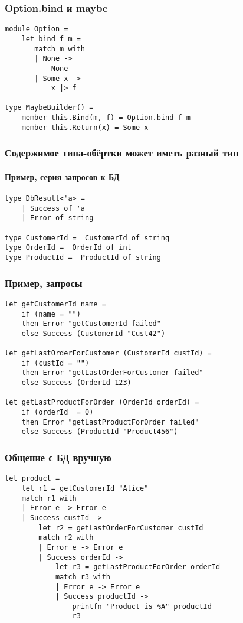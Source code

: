 \documentclass[xetex,mathserif,serif]{beamer}
\begin{document}
    \begin{frame}[fragile]
        \frametitle{Option.bind и maybe}
        \begin{verbatim}
module Option = 
    let bind f m =
       match m with
       | None -> 
           None
       | Some x -> 
           x |> f 

type MaybeBuilder() =
    member this.Bind(m, f) = Option.bind f m
    member this.Return(x) = Some x
        \end{verbatim}
    \end{frame}

    \begin{frame}[fragile]
        \frametitle{Содержимое типа-обёртки может иметь разный тип}
        \framesubtitle{Пример, серия запросов к БД}
        \begin{verbatim}
type DbResult<'a> = 
    | Success of 'a
    | Error of string

type CustomerId =  CustomerId of string
type OrderId =  OrderId of int
type ProductId =  ProductId of string
        \end{verbatim}
    \end{frame}

    \begin{frame}[fragile]
        \frametitle{Пример, запросы}
        \begin{verbatim}
let getCustomerId name =
    if (name = "") 
    then Error "getCustomerId failed"
    else Success (CustomerId "Cust42")

let getLastOrderForCustomer (CustomerId custId) =
    if (custId = "") 
    then Error "getLastOrderForCustomer failed"
    else Success (OrderId 123)

let getLastProductForOrder (OrderId orderId) =
    if (orderId  = 0) 
    then Error "getLastProductForOrder failed"
    else Success (ProductId "Product456")
        \end{verbatim}
    \end{frame}

    \begin{frame}[fragile]
        \frametitle{Общение с БД вручную}
        \begin{verbatim}
let product = 
    let r1 = getCustomerId "Alice"
    match r1 with 
    | Error e -> Error e
    | Success custId ->
        let r2 = getLastOrderForCustomer custId 
        match r2 with 
        | Error e -> Error e
        | Success orderId ->
            let r3 = getLastProductForOrder orderId 
            match r3 with 
            | Error e -> Error e
            | Success productId ->
                printfn "Product is %A" productId
                r3
        \end{verbatim}
    \end{frame}
\end{document}
